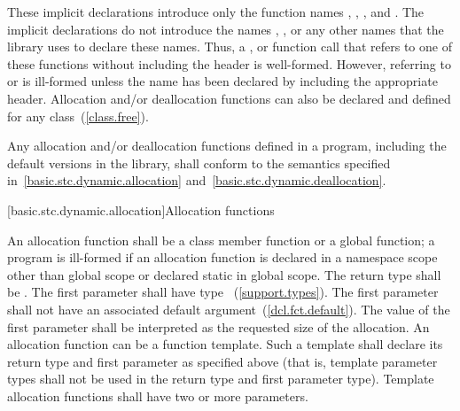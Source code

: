 These implicit declarations introduce only the function names
 ,  ,
 , and 
. \enternote The implicit declarations do not introduce
the names ,
, or any other names that the library uses to
declare these names. Thus, a ,
 or function call that refers to one of
these functions without including the header  is
well-formed. However, referring to 
or  is ill-formed unless the name has been declared
by including the appropriate header. \exitnote Allocation and/or
deallocation functions can also be declared and defined for any
class~(\ref{class.free}).

\pnum
Any allocation and/or deallocation functions defined in a \Cpp program,
including the default versions in the library, shall conform to the
semantics specified in~\ref{basic.stc.dynamic.allocation}
and~\ref{basic.stc.dynamic.deallocation}.

[basic.stc.dynamic.allocation]{Allocation functions}

\pnum
{}%
An allocation function shall be a class member function or a global
function; a program is ill-formed if an allocation function is declared
in a namespace scope other than global scope or declared static in
global scope. The return type shall be . The first
parameter shall have type ~(\ref{support.types}). The
first parameter shall not have an associated default
argument~(\ref{dcl.fct.default}). The value of the first parameter shall
be interpreted as the requested size of the allocation. An allocation
function can be a function template. Such a template shall declare its
return type and first parameter as specified above (that is, template
parameter types shall not be used in the return type and first parameter
type). Template allocation functions shall have two or more parameters.

